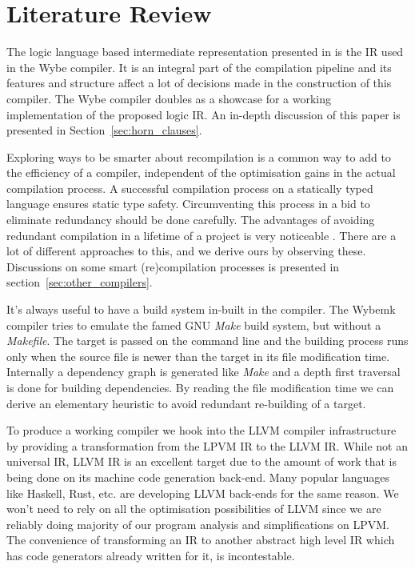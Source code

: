 \chapter{Literature Review}
\label{chap:literature_review}

The logic language based intermediate representation presented in
\cite{lpvm2015} is the IR used in the Wybe compiler. It is an integral part of
the compilation pipeline and its features and structure affect a lot of
decisions made in the construction of this compiler. The Wybe compiler doubles
as a showcase for a working implementation of the proposed logic IR. An
in-depth discussion of this paper is presented in
Section~\ref{sec:horn_clauses}.

Exploring ways to be smarter about recompilation is a common way to add to the
efficiency of a compiler, independent of the optimisation gains in the actual
compilation process. A successful compilation process on a statically typed
language ensures static type safety. Circumventing this process in a bid to
eliminate redundancy should be done carefully. The advantages of avoiding
redundant compilation in a lifetime of a project is very noticeable
\citep{cost_of_recompilation}. There are a lot of different approaches to this,
and we derive ours by observing these. Discussions on some smart
(re)compilation processes is presented in section~\ref{sec:other_compilers}.

It's always useful to have a build system in-built in the compiler. The Wybemk
compiler tries to emulate the famed GNU \textit{Make} \citep{make} build
system, but without a \textit{Makefile}. The target is passed on the command
line and the building process runs only when the source file is newer than the
target in its file modification time. Internally a dependency graph is
generated like \textit{Make} and a depth first traversal is done for building
dependencies. By reading the file modification time we can derive an elementary
heuristic to avoid redundant re-building of a target.

To produce a working compiler we hook into the LLVM compiler infrastructure
\citep{Lattner:MSThesis02} by providing a transformation from the LPVM IR to
the LLVM IR. While not an universal IR, LLVM IR is an excellent target due to
the amount of work that is being done on its machine code generation
back-end. Many popular languages like Haskell, Rust, etc. are developing LLVM
back-ends for the same reason. We won't need to rely on all the optimisation
possibilities of LLVM since we are reliably doing majority of our program
analysis and simplifications on LPVM. The convenience of transforming an IR to
another abstract high level IR which has code generators already written for
it, is incontestable.

